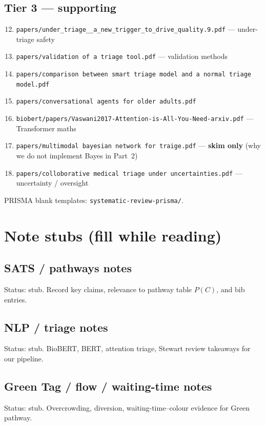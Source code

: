 \documentclass[11pt,a4paper]{article}
\begin{document}
\subsection*{Tier 3 --- supporting}
\begin{enumerate}
  \setcounter{enumi}{11}
  \item \texttt{papers/under\_triage\_\_a\_new\_trigger\_to\_drive\_quality.9.pdf} --- under-triage safety
  \item \texttt{papers/validation of a triage tool.pdf} --- validation methods
  \item \texttt{papers/comparison between smart triage model and a normal triage model.pdf}
  \item \texttt{papers/conversational agents for older adults.pdf}
  \item \texttt{biobert/papers/Vaswani2017-Attention-is-All-You-Need-arxiv.pdf} --- Transformer maths
  \item \texttt{papers/multimodal bayesian network for traige.pdf} --- \textbf{skim only} (why we do not implement Bayes in Part~2)
  \item \texttt{papers/colloborative medical triage under uncertainties.pdf} --- uncertainty / oversight
\end{enumerate}

PRISMA blank templates: \texttt{systematic-review-prisma/}.

\section{Note stubs (fill while reading)}

\subsection*{SATS / pathways notes}
Status: stub. Record key claims, relevance to pathway table $P(C)$, and bib entries.

\subsection*{NLP / triage notes}
Status: stub. BioBERT, BERT, attention triage, Stewart review takeaways for our pipeline.

\subsection*{Green Tag / flow / waiting-time notes}
Status: stub. Overcrowding, diversion, waiting-time--colour evidence for Green pathway.
\end{document}
